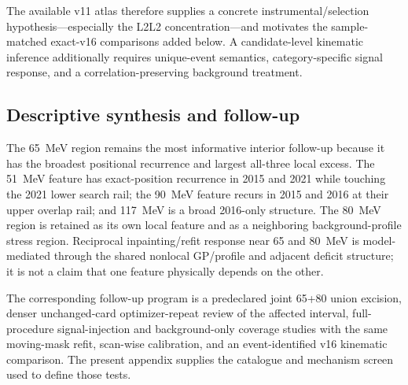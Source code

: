The available v11 atlas therefore supplies a concrete
instrumental/selection hypothesis---especially the L2L2 concentration---and
motivates the sample-matched exact-v16 comparisons added below.  A
candidate-level kinematic inference additionally requires unique-event
semantics, category-specific signal response, and a correlation-preserving
background treatment.

\subsection{Descriptive synthesis and follow-up}
\label{app:candidate-assessment}

The 65~MeV region remains the most informative interior follow-up because it
has the broadest positional recurrence and largest all-three local excess.
The 51~MeV feature has exact-position recurrence in 2015 and 2021 while
touching the 2021 lower search rail; the 90~MeV feature recurs in 2015 and
2016 at their upper overlap rail; and 117~MeV is a broad 2016-only structure.
The 80~MeV region is retained as its own local feature and as a neighboring
background-profile stress region.  Reciprocal inpainting/refit response near
65 and 80~MeV is model-mediated through the shared nonlocal GP/profile and
adjacent deficit structure; it is not a claim that one feature physically
depends on the other.

The corresponding follow-up program is a predeclared joint 65+80 union
excision, denser unchanged-card optimizer-repeat review of the affected
interval, full-procedure signal-injection and background-only coverage studies
with the same moving-mask refit, scan-wise calibration, and an event-identified
v16 kinematic comparison.  The present appendix supplies the catalogue and
mechanism screen used to define those tests.



